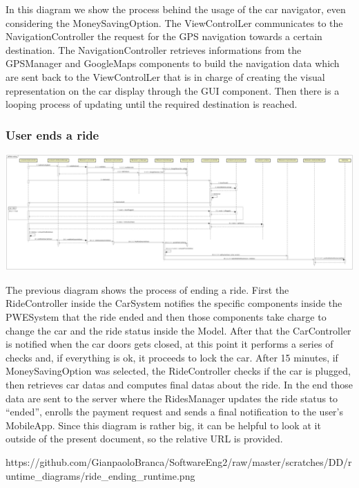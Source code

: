 \documentclass[]{article}
\begin{document}
In this diagram we show the process behind the usage of the car
navigator, even considering the MoneySavingOption. The ViewControlLer
communicates to the NavigationController the request for the GPS
navigation towards a certain destination. The NavigationController
retrieves informations from the GPSManager and GoogleMaps components to
build the navigation data which are sent back to the ViewControlLer that
is in charge of creating the visual representation on the car display
through the GUI component. Then there is a looping process of updating
until the required destination is reached.

\subsubsection{User ends a ride}\label{user-ends-a-ride}

\centerline{\includegraphics{./runtime_diagrams/ride_ending_runtime.png}}

The previous diagram shows the process of ending a ride. First the
RideController inside the CarSystem notifies the specific components
inside the PWESystem that the ride ended and then those components take
charge to change the car and the ride status inside the Model. After
that the CarController is notified when the car doors gets closed, at
this point it performs a series of checks and, if everything is ok, it
proceeds to lock the car. After 15 minutes, if MoneySavingOption was
selected, the RideController checks if the car is plugged, then
retrieves car datas and computes final datas about the ride. In the end
those data are sent to the server where the RidesManager updates the
ride status to ``ended'', enrolls the payment request and sends a final
notification to the user's MobileApp. Since this diagram is rather big,
it can be helpful to look at it outside of the present document, so the
relative URL is provided.

https://github.com/GianpaoloBranca/SoftwareEng2/raw/master/scratches/DD/runtime\_diagrams/ride\_ending\_runtime.png
\end{document}
